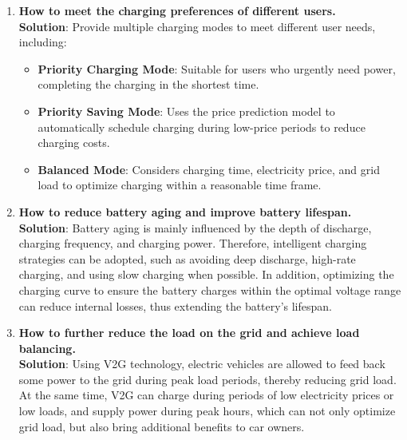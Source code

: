 \documentclass[
	english,
	ruledheaders=section,%
	class=report,%
	thesis={type=Report},%
	accentcolor=9c,%
	custommargins=true,%
	marginpar=false,%
	parskip=half-,%
	fontsize=11pt,%
	logofile={img/tuda_logo.pdf}, %
]{tudapub}
\begin{document}
\begin{enumerate}
    \item \textbf{How to meet the charging preferences of different users.} \\
    \textbf{Solution}: Provide multiple charging modes to meet different user needs, including:
    \begin{itemize}
        \item \textbf{Priority Charging Mode}: Suitable for users who urgently need power, completing the charging in the shortest time.
        \item \textbf{Priority Saving Mode}: Uses the price prediction model to automatically schedule charging during low-price periods to reduce charging costs.
        \item \textbf{Balanced Mode}: Considers charging time, electricity price, and grid load to optimize charging within a reasonable time frame.
    \end{itemize}

    

    \item \textbf{How to reduce battery aging and improve battery lifespan.} \\
    \textbf{Solution}: Battery aging is mainly influenced by the depth of discharge, charging frequency, and charging power. Therefore, intelligent charging strategies can be adopted, such as avoiding deep discharge, high-rate charging, and using slow charging when possible. In addition, optimizing the charging curve to ensure the battery charges within the optimal voltage range can reduce internal losses, thus extending the battery's lifespan.

    
    
    \item \textbf{How to further reduce the load on the grid and achieve load balancing. } \\
    \textbf{Solution}: Using \ac{V2G} technology, electric vehicles are allowed to feed back some power to the grid during peak load periods, thereby reducing grid load. At the same time, \ac{V2G} can charge during periods of low electricity prices or low loads, and supply power during peak hours, which can not only optimize grid load, but also bring additional benefits to car owners.
    

\end{enumerate}
\end{document}
